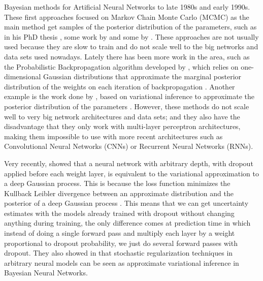 Bayesian methods for Artificial Neural Networks to late 1980s and early 1990s. These first approaches focused on Markov Chain Monte Carlo (MCMC) as the main method get samples of the posterior distribution of the parameters, such as \citeauthor{neal1996bayesian} in his PhD thesis \cite{neal1996bayesian}, some work by \citeauthor{denker1991transforming} \cite{denker1991transforming} and some by \citeauthor{mackay1992practical} \cite{mackay1992practical}. These approaches are not usually used because they are slow to train and do not scale well to the big networks and data sets used nowadays. Lately there has been more work in the area, such as the Probabilistic Backpropagation algorithm developed by \citeauthor{hernandez2015probabilistic}, which relies on one-dimensional Gaussian distributions that approximate the marginal posterior distribution of the weights on each iteration of backpropagation \cite{hernandez2015probabilistic}. Another example is the work done by \citeauthor{graves2011practical}, based on variational inference to approximate the posterior distribution of the parameters \cite{graves2011practical}. However, these methods do not scale well to very big network architectures and data sets; and they also have the disadvantage that they only work with multi-layer perceptron architectures, making them impossible to use with more recent architectures such as Convolutional Neural Networks (CNNs) or Recurrent Neural Networks (RNNs).

Very recently, \citeauthor{gal2015dropout1} showed that a neural network with arbitrary depth, with dropout applied before each weight layer, is equivalent to the variational approximation to a deep Gaussian process. This is because the loss function minimizes the Kullback Leibler divergence between an approximate distribution and the posterior of a deep Gaussian process \cite{gal2015dropout1}. This means that we can get uncertainty estimates with the models already trained with dropout without changing anything during training, the only difference comes at prediction time in which instead of doing a single forward pass and multiply each layer by a weight proportional to dropout probability, we just do several forward passes with dropout. They also showed in \cite{gal2015modern} that stochastic regularization techniques in arbitrary neural models can be seen as approximate variational inference in Bayesian Neural Networks.

